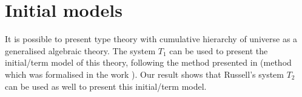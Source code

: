\documentclass[11pt,a4paper]{article}
\theoremstyle{definition}
\begin{document}
\section{Initial models}

It is possible to present type theory with cumulative hierarchy of universe as a generalised algebraic theory.
The system $T_1$ can be used to present the initial/term model of this theory, following the method presented in \cite{Streicher:semtt}
(method which was formalised in the work \cite{brunerie:initiality}).
Our result shows that Russell's system $T_2$ can be used as well to present this initial/term model.





\end{document}
